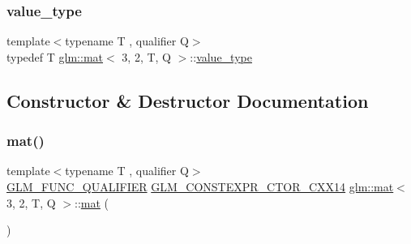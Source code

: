 \mbox{\label{structglm_1_1mat_3_013_00_012_00_01_t_00_01_q_01_4_ae1e6e1cc8ff07c13ae805cabd6cefd77}} 
\subsubsection{\texorpdfstring{value\+\_\+type}{value\_type}}
{\footnotesize\ttfamily template$<$typename T , qualifier Q$>$ \\
typedef T \hyperlink{structglm_1_1mat}{glm\+::mat}$<$ 3, 2, T, Q $>$\+::\hyperlink{structglm_1_1mat_3_013_00_012_00_01_t_00_01_q_01_4_ae1e6e1cc8ff07c13ae805cabd6cefd77}{value\+\_\+type}}



\subsection{Constructor \& Destructor Documentation}
\mbox{\label{structglm_1_1mat_3_013_00_012_00_01_t_00_01_q_01_4_a20c83ce0aec4f293bfb3923b465fe495}} 
\subsubsection{\texorpdfstring{mat()}{mat()}\hspace{0.1cm}{\footnotesize\ttfamily [1/21]}}
{\footnotesize\ttfamily template$<$typename T , qualifier Q$>$ \\
\hyperlink{setup_8hpp_a33fdea6f91c5f834105f7415e2a64407}{G\+L\+M\+\_\+\+F\+U\+N\+C\+\_\+\+Q\+U\+A\+L\+I\+F\+I\+ER} \hyperlink{setup_8hpp_a0900f9145e68bf6061b6f5e7be3fa751}{G\+L\+M\+\_\+\+C\+O\+N\+S\+T\+E\+X\+P\+R\+\_\+\+C\+T\+O\+R\+\_\+\+C\+X\+X14} \hyperlink{structglm_1_1mat}{glm\+::mat}$<$ 3, 2, T, Q $>$\+::\hyperlink{structglm_1_1mat}{mat} (\begin{DoxyParamCaption}{ }\end{DoxyParamCaption})}

\mbox{\label{structglm_1_1mat_3_013_00_012_00_01_t_00_01_q_01_4_aae7ec73b0747140723ff9678e024ad52}} 
